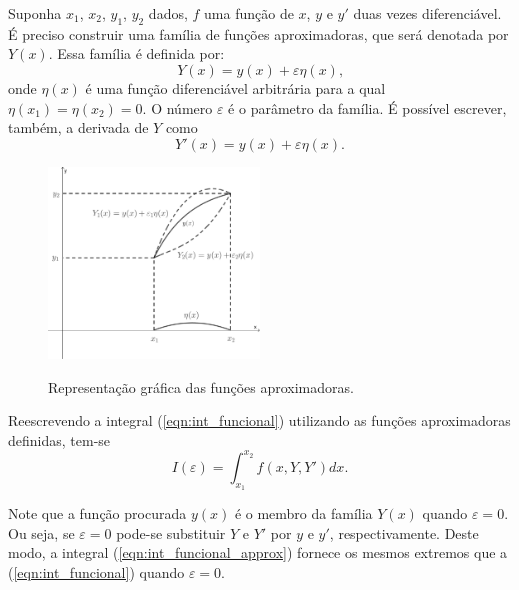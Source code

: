Suponha $x_1$, $x_2$, $y_1$, $y_2$ dados, $f$ uma função de $x$, $y$ e $y'$ duas vezes diferenciável. É preciso construir uma família de funções aproximadoras, que será denotada por $Y(x)$. Essa família é definida por:
\begin{equation}\label{eqn:cap_calcvar_eq_approx}
	Y(x)=y(x)+\varepsilon \eta (x)\text{,}
\end{equation}
onde $\eta (x)$ é uma função diferenciável arbitrária para a qual $\eta (x_1)=\eta (x_2) = 0$. O número $\varepsilon$ é o parâmetro da família. É possível escrever, também, a derivada de $Y$ como
\begin{equation}\label{eqn:cap_calcvar_eq_approx_diff}
	Y'(x)=y(x)+\varepsilon \eta (x)\text{.}
\end{equation}


\begin{figure}[!h]
	\caption{Representação gráfica das funções aproximadoras.}
	\centering
	\includegraphics[width=0.5\textwidth, angle=0]{../figuras/cap_calcvar/figura_001.pdf}
	\label{fig:test_01}
\end{figure}

Reescrevendo a integral (\ref{eqn:int_funcional}) utilizando as funções aproximadoras definidas, tem-se
\begin{equation}\label{eqn:int_funcional_approx}
I(\varepsilon)=\int_{x_1}^{x_2}f(x, Y, Y')dx\text{.}
\end{equation}

Note que a função procurada $y(x)$ é o membro da família $Y(x)$ quando $\varepsilon = 0$. Ou seja, se $\varepsilon = 0$ pode-se substituir $Y$ e $Y'$ por $y$ e $y'$, respectivamente. Deste modo, a integral (\ref{eqn:int_funcional_approx}) fornece os mesmos extremos que a (\ref{eqn:int_funcional}) quando $\varepsilon=0$.

